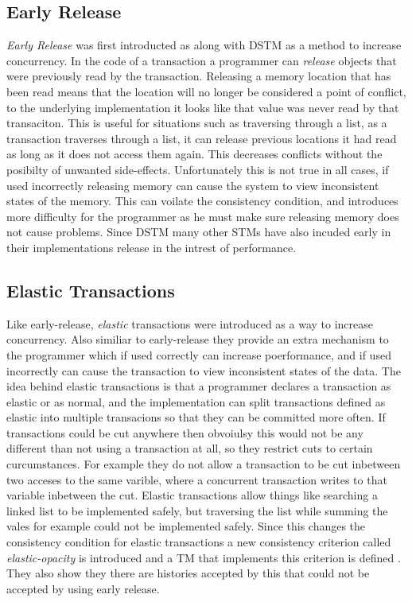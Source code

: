 \subsection{Early Release}
\emph{Early Release} was first introducted as along with DSTM \cite{872048} as a method to increase concurrency.
In the code of a transaction a programmer can \emph{release} objects that were previously read by the transaction.
Releasing a memory location that has been read means that the location will no longer be considered a point of conflict, to the underlying implementation it looks like that value was never read by that transaciton.
This is useful for situations such as traversing through a list, as a transaction traverses through a list, it can release previous locations it had read as long as it does not access them again.
This decreases conflicts without the posibilty of unwanted side-effects.
Unfortunately this is not true in all cases, if used incorrectly releasing memory can cause the system to view inconsistent states of the memory.
This can voilate the consistency condition, and introduces more difficulty for the programmer as he must make sure releasing memory does not cause problems.
Since DSTM many other STMs have also incuded early in their implementations release in the intrest of performance.

\subsection{Elastic Transactions}
Like early-release, \emph{elastic} transactions \cite{LPD-REPORT-2009-002} were introduced as a way to increase concurrency.
Also similiar to early-release they provide an extra mechanism to the programmer which if used correctly can increase poerformance, and if used incorrectly can cause the transaction to view inconsistent states of the data.
The idea behind elastic transactions is that a programmer declares a transaction as elastic or as normal, and the implementation can split transactions defined as elastic into multiple transacions so that they can be committed more often.
If transactions could be cut anywhere then obvoiulsy this would not be any different than not using a transaction at all, so they restrict cuts to certain curcumstances.
For example they do not allow a transaction to be cut inbetween two acceses to the same varible, where a concurrent transaction writes to that variable inbetween the cut.
Elastic transactions allow things like searching a linked list to be implemented safely, but traversing the list while summing the vales for example could not be implemented safely.
Since this changes the consistency condition for elastic transactions a new consistency criterion called \emph{elastic-opacity} is introduced and a TM that implements this criterion is defined \cite{LPD-REPORT-2009-002}.
They also show they there are histories accepted by this that could not be accepted by using early release.

